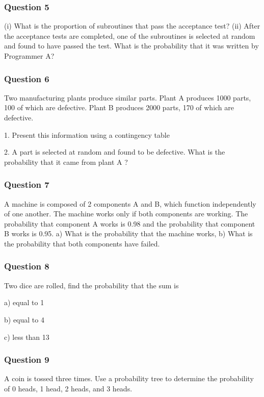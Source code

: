 \documentclass[IntroMain.tex]{subfiles}
\begin{document}
\begin{frame}
\frametitle{Question 5}
(i) What is the proportion of subroutines that pass the acceptance test?
(ii) After the acceptance tests are completed, one of the subroutines is selected at random and found to have passed the test. What is the probability that it was written by Programmer A?




\end{frame}
\begin{frame}
\frametitle{Question 6}
Two manufacturing plants produce similar parts. Plant A produces 1000 parts, 100 of which are defective. Plant B produces 2000 parts, 170 of which are defective. 

1.	Present this information using a contingency table

2.	A part is selected at random and found to be defective. What is the probability that it came from plant A ?
\end{frame}
\begin{frame}
\frametitle{Question 7}
A machine is composed of 2 components A and B, which function independently of one another. The machine works only if both components are working. The probability that component A works is 0.98 and the probability that component B works is 0.95.
a)	What is the probability that the machine works, 
b)	What is the probability that both components have failed.
 
\end{frame}
\begin{frame}
\frametitle{Question 8} 
Two dice are rolled, find the probability that the sum is 

a) equal to 1 

b) equal to 4 

c) less than 13
\end{frame}
\begin{frame}
\frametitle{Question 9}
A coin is tossed three times. Use a probability tree to determine the probability of 0 heads, 1 head, 2 heads, and 3 heads.



\end{frame}
\end{document}
